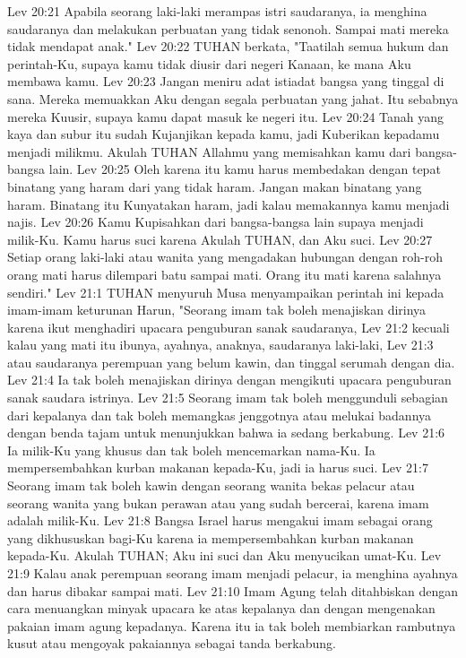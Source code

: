 Lev 20:21  Apabila seorang laki-laki merampas istri saudaranya, ia menghina saudaranya dan melakukan perbuatan yang tidak senonoh. Sampai mati mereka tidak mendapat anak."
Lev 20:22  TUHAN berkata, "Taatilah semua hukum dan perintah-Ku, supaya kamu tidak diusir dari negeri Kanaan, ke mana Aku membawa kamu.
Lev 20:23  Jangan meniru adat istiadat bangsa yang tinggal di sana. Mereka memuakkan Aku dengan segala perbuatan yang jahat. Itu sebabnya mereka Kuusir, supaya kamu dapat masuk ke negeri itu.
Lev 20:24  Tanah yang kaya dan subur itu sudah Kujanjikan kepada kamu, jadi Kuberikan kepadamu menjadi milikmu. Akulah TUHAN Allahmu yang memisahkan kamu dari bangsa-bangsa lain.
Lev 20:25  Oleh karena itu kamu harus membedakan dengan tepat binatang yang haram dari yang tidak haram. Jangan makan binatang yang haram. Binatang itu Kunyatakan haram, jadi kalau memakannya kamu menjadi najis.
Lev 20:26  Kamu Kupisahkan dari bangsa-bangsa lain supaya menjadi milik-Ku. Kamu harus suci karena Akulah TUHAN, dan Aku suci.
Lev 20:27  Setiap orang laki-laki atau wanita yang mengadakan hubungan dengan roh-roh orang mati harus dilempari batu sampai mati. Orang itu mati karena salahnya sendiri."
Lev 21:1  TUHAN menyuruh Musa menyampaikan perintah ini kepada imam-imam keturunan Harun, "Seorang imam tak boleh menajiskan dirinya karena ikut menghadiri upacara penguburan sanak saudaranya,
Lev 21:2  kecuali kalau yang mati itu ibunya, ayahnya, anaknya, saudaranya laki-laki,
Lev 21:3  atau saudaranya perempuan yang belum kawin, dan tinggal serumah dengan dia.
Lev 21:4  Ia tak boleh menajiskan dirinya dengan mengikuti upacara penguburan sanak saudara istrinya.
Lev 21:5  Seorang imam tak boleh menggunduli sebagian dari kepalanya dan tak boleh memangkas jenggotnya atau melukai badannya dengan benda tajam untuk menunjukkan bahwa ia sedang berkabung.
Lev 21:6  Ia milik-Ku yang khusus dan tak boleh mencemarkan nama-Ku. Ia mempersembahkan kurban makanan kepada-Ku, jadi ia harus suci.
Lev 21:7  Seorang imam tak boleh kawin dengan seorang wanita bekas pelacur atau seorang wanita yang bukan perawan atau yang sudah bercerai, karena imam adalah milik-Ku.
Lev 21:8  Bangsa Israel harus mengakui imam sebagai orang yang dikhususkan bagi-Ku karena ia mempersembahkan kurban makanan kepada-Ku. Akulah TUHAN; Aku ini suci dan Aku menyucikan umat-Ku.
Lev 21:9  Kalau anak perempuan seorang imam menjadi pelacur, ia menghina ayahnya dan harus dibakar sampai mati.
Lev 21:10  Imam Agung telah ditahbiskan dengan cara menuangkan minyak upacara ke atas kepalanya dan dengan mengenakan pakaian imam agung kepadanya. Karena itu ia tak boleh membiarkan rambutnya kusut atau mengoyak pakaiannya sebagai tanda berkabung.
